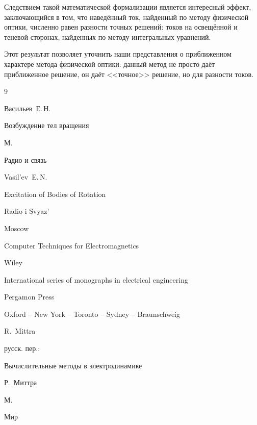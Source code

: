 Следствием такой математической формализации является интересный эффект, заключающийся в том, что наведённый ток, найденный по методу физической оптики, численно равен разности точных решений: токов на освещённой и теневой сторонах, найденных по методу интегральных уравнений. 

Этот результат позволяет уточнить наши представления о приближенном характере метода физической оптики: данный метод не просто даёт приближенное решение, он даёт <<точное>> решение, но для разности токов.





\begin{thebibliography}{9}


\by Васильев~Е.\,Н.

\book Возбуждение тел вращения 

\publaddr М.

\publ Радио и связь



\misctransl

\by Vasil'ev~E.\,N.

\book Excitation of Bodies of Rotation 

\publ Radio i Svyaz'

\publaddr Moscow






\book Computer Techniques for Electromagnetics

\publ Wiley

\serial International series of monographs in electrical engineering


\publ Pergamon Press

\publaddr Oxford -- New York -- Toronto -- Sydney -- Braunschweig

\ed R.~Mittra



\rtransl русск. пер.:~

\book Вычислительные методы в электродинамике

\ed Р.~Миттра

\publaddr М.

\publ Мир


\end{thebibliography}
